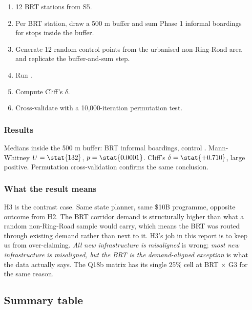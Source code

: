 \begin{enumerate}
 \item 12 BRT stations from S5.
 \item Per BRT station, draw a 500 m buffer and sum Phase 1 informal
 boardings for stops inside the buffer.
 \item Generate 12 random control points from the urbanised
 non-Ring-Road area and replicate the buffer-and-sum step.
 \item Run .
 \item Compute Cliff's $\delta$.
 \item Cross-validate with a 10{,}000-iteration permutation test.
\end{enumerate}

\subsubsection{Results}

Medians inside the 500 m buffer: BRT  informal boardings,
control . Mann-Whitney $U = \stat{132}$, $p = \stat{0.0001}$.
Cliff's $\delta = \stat{+0.710}$, large positive. Permutation
cross-validation confirms the same conclusion.


\subsubsection{What the result means}

\begin{callout}
H3 is the contrast case. Same state planner, same \$10B programme,
opposite outcome from H2. The BRT corridor demand is structurally
higher than what a random non-Ring-Road sample would carry, which
means the BRT was routed through existing demand rather than next to
it. H3's job in this report is to keep us from over-claiming.
\emph{All new infrastructure is misaligned} is wrong; \emph{most new
infrastructure is misaligned, but the BRT is the demand-aligned
exception} is what the data actually says. The Q18b matrix has its
single 25\% cell at BRT $\times$ G3 for the same reason.
\end{callout}

\subsection{Summary table}
\label{sec:hyp-summary}

